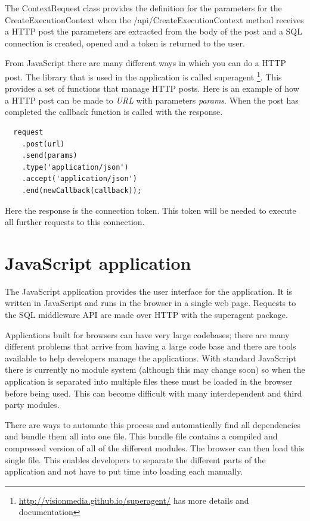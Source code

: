 The ContextRequest class provides the definition for the parameters for
the CreateExecutionContext when the /api/CreateExecutionContext method
receives a HTTP post the parameters are extracted from the body of the
post and a SQL connection is created, opened and a token is returned to
the user.

From JavaScript there are many different ways in which you can do a HTTP post.
The library that is used in the application is called superagent%
\footnote{\url{http://visionmedia.github.io/superagent/} has more details and
documentation}. This provides a set of functions that manage HTTP posts. Here is
an example of how a HTTP post can be made to \emph{URL} with parameters
\emph{params}. When the post has completed the callback function is called with
the response.

\begin{listing}[ht]
\begin{verbatim}
  request
    .post(url)
    .send(params)
    .type('application/json')
    .accept('application/json')
    .end(newCallback(callback));
\end{verbatim}
\end{listing}

Here the response is the connection token. This token will be needed to
execute all further requests to this connection.

\section{JavaScript application}\label{javascript-application}

The JavaScript application provides the user interface for the
application. It is written in JavaScript and runs in the browser in a
single web page. Requests to the SQL middleware API are made over HTTP
with the superagent package.

Applications built for browsers can have very large codebases; there are many
different problems that arrive from having a large code base and there are tools
available to help developers manage the applications. With standard JavaScript
there is currently no module system (although this may change
soon\cite{javascriptes6}) so when the application is separated into multiple
files these must be loaded in the browser before being used. This can become
difficult with many interdependent and third party modules.

There are ways to automate this process and automatically find all dependencies
and bundle them all into one file. This bundle file contains a compiled and
compressed version of all of the different modules. The browser can then load
this single file. This enables developers to separate the different parts of the application and not have to
put time into loading each manually.

